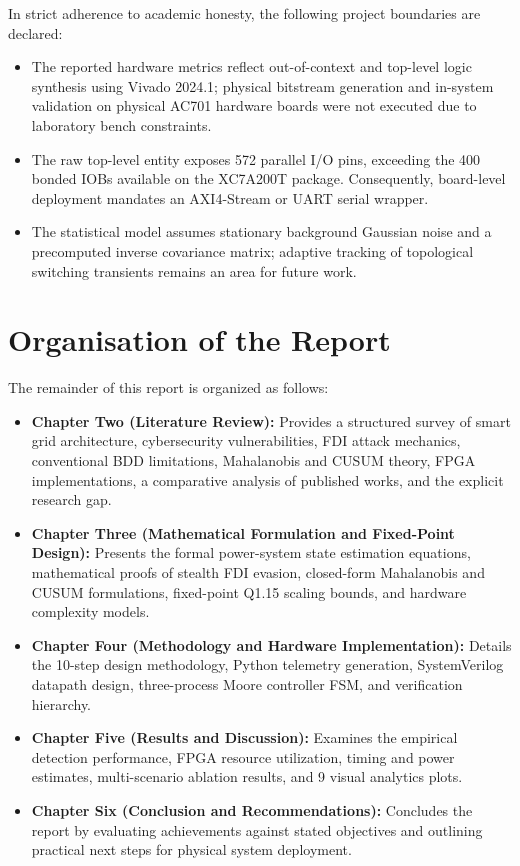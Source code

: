 \documentclass[11pt,a4paper]{report}
\begin{document}
In strict adherence to academic honesty, the following project boundaries are declared:
\begin{itemize}
    \item The reported hardware metrics reflect out-of-context and top-level logic
    synthesis using Vivado 2024.1; physical bitstream generation and in-system
    validation on physical AC701 hardware boards were not executed due to laboratory
    bench constraints.
    \item The raw top-level entity exposes 572 parallel I/O pins, exceeding the 400
    bonded IOBs available on the XC7A200T package. Consequently, board-level deployment
    mandates an AXI4-Stream or UART serial wrapper.
    \item The statistical model assumes stationary background Gaussian noise and a
    precomputed inverse covariance matrix; adaptive tracking of topological switching
    transients remains an area for future work.
\end{itemize}

\section{Organisation of the Report}
The remainder of this report is organized as follows:
\begin{itemize}
    \item \textbf{Chapter Two (Literature Review):} Provides a structured survey of
    smart grid architecture, cybersecurity vulnerabilities, FDI attack mechanics,
    conventional BDD limitations, Mahalanobis and CUSUM theory, FPGA implementations,
    a comparative analysis of published works, and the explicit research gap.
    \item \textbf{Chapter Three (Mathematical Formulation and Fixed-Point Design):}
    Presents the formal power-system state estimation equations, mathematical proofs
    of stealth FDI evasion, closed-form Mahalanobis and CUSUM formulations, fixed-point
    Q1.15 scaling bounds, and hardware complexity models.
    \item \textbf{Chapter Four (Methodology and Hardware Implementation):} Details the
    10-step design methodology, Python telemetry generation, SystemVerilog datapath
    design, three-process Moore controller FSM, and verification hierarchy.
    \item \textbf{Chapter Five (Results and Discussion):} Examines the empirical
    detection performance, FPGA resource utilization, timing and power estimates,
    multi-scenario ablation results, and 9 visual analytics plots.
    \item \textbf{Chapter Six (Conclusion and Recommendations):} Concludes the report
    by evaluating achievements against stated objectives and outlining practical next
    steps for physical system deployment.
\end{itemize}
\end{document}
